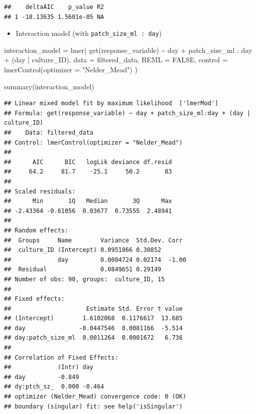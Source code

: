 \documentclass[
]{article}
\newenvironment{Shaded}{\begin{snugshade}}{\end{snugshade}}
\newcommand{\AttributeTok}[1]{\textcolor[rgb]{0.77,0.63,0.00}{#1}}
\newcommand{\ConstantTok}[1]{\textcolor[rgb]{0.00,0.00,0.00}{#1}}
\newcommand{\FunctionTok}[1]{\textcolor[rgb]{0.00,0.00,0.00}{#1}}
\newcommand{\NormalTok}[1]{#1}
\newcommand{\OtherTok}[1]{\textcolor[rgb]{0.56,0.35,0.01}{#1}}
\newcommand{\SpecialCharTok}[1]{\textcolor[rgb]{0.00,0.00,0.00}{#1}}
\newcommand{\StringTok}[1]{\textcolor[rgb]{0.31,0.60,0.02}{#1}}
\providecommand{\tightlist}{%
  \setlength{\itemsep}{0pt}\setlength{\parskip}{0pt}}
\begin{document}
\begin{verbatim}
##    deltaAIC    p_value R2
## 1 -18.13635 1.5601e-05 NA
\end{verbatim}

\begin{itemize}
\tightlist
\item
  Interaction model (with \texttt{patch\_size\_ml\ :\ day})
\end{itemize}

\begin{Shaded}
\begin{Highlighting}[]
\NormalTok{interaction\_model }\OtherTok{=} \FunctionTok{lmer}\NormalTok{(}
  \FunctionTok{get}\NormalTok{(response\_variable) }\SpecialCharTok{\textasciitilde{}}
\NormalTok{    day }\SpecialCharTok{+}
\NormalTok{    patch\_size\_ml }\SpecialCharTok{:}\NormalTok{ day }\SpecialCharTok{+}
\NormalTok{    (day }\SpecialCharTok{|}\NormalTok{ culture\_ID),}
  \AttributeTok{data =}\NormalTok{ filtered\_data,}
  \AttributeTok{REML =} \ConstantTok{FALSE}\NormalTok{,}
  \AttributeTok{control =} \FunctionTok{lmerControl}\NormalTok{(}\AttributeTok{optimizer =} \StringTok{"Nelder\_Mead"}\NormalTok{)}
\NormalTok{)}

\FunctionTok{summary}\NormalTok{(interaction\_model)}
\end{Highlighting}
\end{Shaded}

\begin{verbatim}
## Linear mixed model fit by maximum likelihood  ['lmerMod']
## Formula: get(response_variable) ~ day + patch_size_ml:day + (day | culture_ID)
##    Data: filtered_data
## Control: lmerControl(optimizer = "Nelder_Mead")
## 
##      AIC      BIC   logLik deviance df.resid 
##     64.2     81.7    -25.1     50.2       83 
## 
## Scaled residuals: 
##      Min       1Q   Median       3Q      Max 
## -2.43364 -0.61056  0.03677  0.73555  2.48941 
## 
## Random effects:
##  Groups     Name        Variance  Std.Dev. Corr 
##  culture_ID (Intercept) 0.0951866 0.30852       
##             day         0.0004724 0.02174  -1.00
##  Residual               0.0849651 0.29149       
## Number of obs: 90, groups:  culture_ID, 15
## 
## Fixed effects:
##                     Estimate Std. Error t value
## (Intercept)        1.6102068  0.1176617  13.685
## day               -0.0447546  0.0081166  -5.514
## day:patch_size_ml  0.0011264  0.0001672   6.736
## 
## Correlation of Fixed Effects:
##             (Intr) day   
## day         -0.849       
## dy:ptch_sz_  0.000 -0.464
## optimizer (Nelder_Mead) convergence code: 0 (OK)
## boundary (singular) fit: see help('isSingular')
\end{verbatim}
\end{document}

